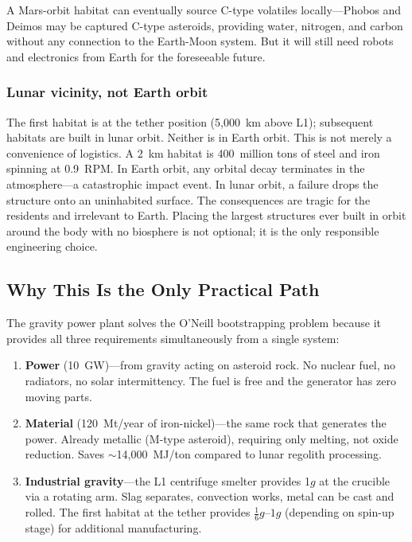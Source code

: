 \documentclass[12pt,letterpaper]{article}
\begin{document}
A Mars-orbit habitat can eventually source C-type volatiles locally---Phobos and Deimos may be captured C-type asteroids, providing water, nitrogen, and carbon without any connection to the Earth-Moon system. But it will still need robots and electronics from Earth for the foreseeable future.

\subsubsection{Lunar vicinity, not Earth orbit}

The first habitat is at the tether position (5{,}000~km above L1); subsequent habitats are built in lunar orbit. Neither is in Earth orbit. This is not merely a convenience of logistics. A 2~km habitat is 400~million tons of steel and iron spinning at 0.9~RPM. In Earth orbit, any orbital decay terminates in the atmosphere---a catastrophic impact event. In lunar orbit, a failure drops the structure onto an uninhabited surface. The consequences are tragic for the residents and irrelevant to Earth. Placing the largest structures ever built in orbit around the body with no biosphere is not optional; it is the only responsible engineering choice.

\subsection{Why This Is the Only Practical Path}

The gravity power plant solves the O'Neill bootstrapping problem because it provides all three requirements simultaneously from a single system:

\begin{enumerate}[label=\arabic*.]
\item \textbf{Power} (10~GW)---from gravity acting on asteroid rock. No nuclear fuel, no radiators, no solar intermittency. The fuel is free and the generator has zero moving parts.
\item \textbf{Material} (120~Mt/year of iron-nickel)---the same rock that generates the power. Already metallic (M-type asteroid), requiring only melting, not oxide reduction. Saves $\sim$14,000~MJ/ton compared to lunar regolith processing.
\item \textbf{Industrial gravity}---the L1 centrifuge smelter provides 1$g$ at the crucible via a rotating arm. Slag separates, convection works, metal can be cast and rolled. The first habitat at the tether provides $\frac{1}{6}g$--$1g$ (depending on spin-up stage) for additional manufacturing.
\end{enumerate}
\end{document}
